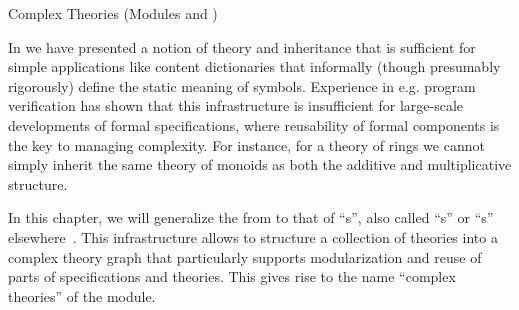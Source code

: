 
\begin{tchapter}[id=complex-theories,short=Complex Theories]{Complex Theories (Modules
     and )}

  In  we have presented a notion of theory and inheritance
  that is sufficient for simple applications like content dictionaries that informally
  (though presumably rigorously) define the static meaning of symbols. Experience in
  e.g. program verification has shown that this infrastructure is insufficient for
  large-scale developments of formal specifications, where reusability of formal
  components is the key to managing complexity. For instance, for a theory of rings we
  cannot simply inherit the same theory of monoids as both the additive and multiplicative
  structure.

  In this chapter, we will generalize the  from
   to that of ``s'', also called
  ``s'' or ``s''
  elsewhere~\cite{Farmer93}.  This infrastructure allows to structure a collection of
  theories into a complex theory graph that particularly supports modularization and reuse
  of parts of specifications and theories. This gives rise to the name ``complex
  theories'' of the \omdoc module.


\end{tchapter}
